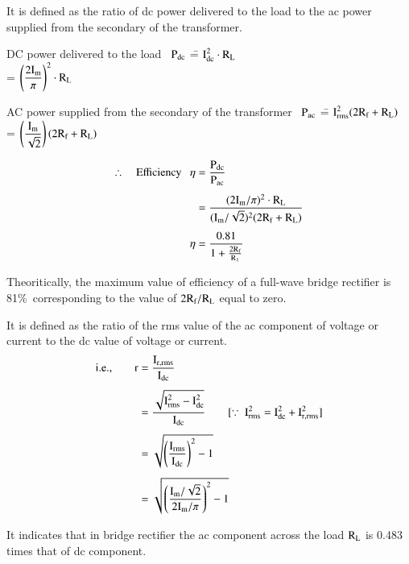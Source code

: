  It is defined as the ratio of dc power delivered to the load to the ac power supplied from the secondary of the transformer.

\begin{tabbing}
DC power delivered to the load \ $\textrm{P}_{\text{dc}}$ \== $\textrm{I}^{2}_{\text{dc}}\cdot \textrm{R}_{\textrm{L}}$\\[4pt]
                                                 \>= $\left(\dfrac{2\textrm{I}_{\textrm{m}}}{\pi}\right)^{2}\cdot \textrm{R}_{\textrm{L}}$
\end{tabbing}

\begin{tabbing}
AC power supplied from the secondary of the transformer \ $\textrm{P}_{\text{ac}}$ \== $\textrm{I}^{2}_{\text{rms}}(2\textrm{R}_{\textrm{f}}+\textrm{R}_{\textrm{L}})$\\[4pt]
\>= $\left(\dfrac{\textrm{I}_{\textrm{m}}}{\sqrt{2}}\right)(2\textrm{R}_{\textrm{f}}+\textrm{R}_{\textrm{L}})$
\end{tabbing}
\begin{align}
\therefore\quad \text{Efficiency~~ } \eta &= \frac{\textrm{P}_{\text{dc}}}{\textrm{P}_{\text{ac}}}\notag\\[4pt]
&= \frac{(2\textrm{I}_{\textrm{m}}/\pi)^{2}\cdot \textrm{R}_{\textrm{L}}}{(\textrm{I}_{\textrm{m}}/\sqrt{2})^{2}(2\textrm{R}_{\textrm{f}}+\textrm{R}_{\textrm{L}})}\notag\\[4pt]
\eta &= \frac{0.81}{1+\frac{2\textrm{R}_{\textrm{f}}}{\textrm{R}_{1}}}\label{eq}
\end{align}

Theoritically, the maximum value of efficiency of a full-wave bridge rectifier is 81\%\ corresponding to the value of $2\textrm{R}_{\textrm{f}}/\textrm{R}_{\textrm{L}}$ equal to zero.

\smallskip
{} It is defined as the ratio of the rms value of the ac component of voltage or current to the dc value of voltage or current.
\begin{align*}
\text{i.e.,}\qquad \rmr &= \frac{\rmI_{\rmr,\text{rms}}}{\rmI_{\text{dc}}}\\[4pt]
 &= \frac{\sqrt{\rmI^{2}_{\text{rms}}-\rmI^{2}_{\text{dc}}}}{\rmI_{\text{dc}}}\qquad [\because \ \rmI^{2}_{\text{rms}}=\rmI^{2}_{\text{dc}}+\rmI^{2}_{\rmr,\text{rms}}]\\[4pt]
&= \sqrt{\left(\frac{\rmI_{\text{rms}}}{\rmI_{\text{dc}}}\right)^{2}-1}\\[4pt]
&= \sqrt{\left(\frac{\rmI_{\rmm}/\sqrt{2}}{2\rmI_{\rmm}/\pi}\right)^{2}-1}
\end{align*}

It indicates that in bridge rectifier the ac component across the load $\textrm{R}_{\textrm{L}}$ is 0.483 times that of dc component.

